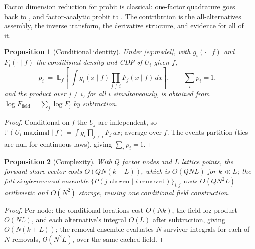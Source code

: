 \documentclass[12pt]{article}
\newtheorem{proposition}{Proposition}
\theoremstyle{remark}
\newcommand{\E}{\mathbb{E}}
\newcommand{\Prob}{\mathbb{P}}
\begin{document}
Factor dimension reduction for probit
is classical:
one-factor quadrature goes back to \citet{butler1982},
and factor-analytic probit to \citet{elrod1995}. The
contribution is the all-alternatives assembly, the inverse transform, the
derivative structure, and evidence for all of it.

\begin{proposition}[Conditional identity]\label{prop:identity}
Under \eqref{eq:model}, with $g_i(\cdot \mid f)$ and $F_i(\cdot \mid f)$
the conditional density and CDF of $U_i$ given $f$,
\begin{equation}
p_i \;=\; \E_f\!\left[\;\int g_i(x \mid f)
\prod_{j \neq i} F_j(x \mid f)\, dx \right],
\qquad \sum_i p_i = 1,
\label{eq:forward}
\end{equation}
and the product over $j \ne i$, for all $i$ simultaneously, is obtained from
$\log F_{\mathrm{field}} = \sum_j \log F_j$ by subtraction.
\end{proposition}
\begin{proof}
Conditional on $f$ the $U_j$ are independent, so $\Prob(U_i \text{ maximal}
\mid f) = \int g_i \prod_{j\ne i} F_j\,dx$; average over $f$. The events
partition (ties are null for continuous laws), giving $\sum_i p_i = 1$.
\end{proof}

\begin{proposition}[Complexity]\label{prop:complexity}
With $Q$ factor nodes and $L$ lattice points, the forward share vector
costs $O(QN(k+L))$, which is $O(QNL)$ for $k \ll L$; the full
single-removal ensemble $\{P(j \text{ chosen} \mid i
\text{ removed})\}_{i,j}$ costs $O(QN^2L)$ arithmetic and $O(N^2)$ storage,
reusing one conditional field construction.
\end{proposition}
\begin{proof}
Per node: the conditional locations cost $O(Nk)$, the field log-product
$O(NL)$, and each alternative's integral $O(L)$ after subtraction, giving
$O(N(k+L))$; the removal ensemble evaluates $N$
survivor integrals for each of $N$ removals, $O(N^2L)$, over the same cached
field.
\end{proof}
\end{document}
